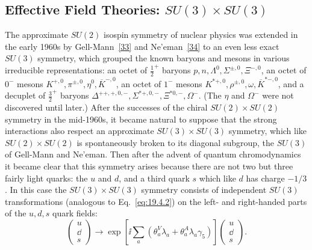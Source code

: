
\subsection{\texorpdfstring{Effective Field Theories: $SU(3)\times SU(3)$}{Effective Field Theories: SU(3) . SU(3)}}
\label{sec:19.7}

The approximate $SU(2)$ isospin symmetry of nuclear physics was extended in the early 1960s by Gell-Mann~\hyperref[ch19-ref-33]{[33]} and Ne'eman~\hyperref[ch19-ref-34]{[34]} to an even less exact $SU(3)$ symmetry, which grouped the known baryons and mesons in various irreducible representations: an octet of $\frac{1}{2}^+$ baryons $p,n,\Lambda^0,\Sigma^{\pm,0},\allowbreak\Xi^{-,0}$, an octet of $0^-$ mesons $K^{+,0},\pi^{\pm,0},\eta^0,\allowbreak\overline K^{-,0}$, an octet of $1^-$ mesons $K^{*+,0},\rho^{\pm,0},\omega,\allowbreak\overline K^{*-,0}$, and a decuplet of $\frac{3}{2}^+$ baryons $\Delta^{++,+,0,-},\Sigma^{*+,0,-},\allowbreak\Xi^{*0,-},\Omega^-$. (The $\eta$ and $\Omega^-$ were not discovered until later.) After the successes of the chiral $SU(2)\times SU(2)$ symmetry in the mid-1960s, it became natural to suppose that the strong interactions also respect an approximate $SU(3)\times SU(3)$ symmetry, which like $SU(2)\times SU(2)$ is spontaneously broken to its diagonal subgroup, the $SU(3)$ of Gell-Mann and Ne'eman. Then after the advent of quantum chromodynamics it became clear that this symmetry arises because there are not two but three fairly light quarks: the $u$ and $d$, and a third quark $s$ which like $d$ has charge $-1/3$. In this case the $SU(3)\times SU(3)$ symmetry consists of independent $SU(3)$ transformations (analogous to Eq.~\eqref{eq:19.4.2}) on the left- and right-handed parts of the $u,d,s$ quark fields:
\begin{equation}
\begin{pmatrix}u\\\dd\\s\end{pmatrix}
\longrightarrow
\exp\left[\ii\sum_a\left(\theta_a^V\lambda_a+
\theta_a^A\lambda_a\gamma_5\right)\right]
\begin{pmatrix}u\\\dd\\s\end{pmatrix}.
\tag{19.7.1}\label{eq:19.7.1}
\end{equation}
